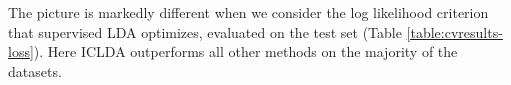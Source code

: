 The picture is markedly different when we consider the log likelihood criterion that supervised LDA optimizes, evaluated on the test set (Table \ref{table:cvresults-loss}). Here ICLDA outperforms all other methods on the majority of the datasets. 

%
%



%
%


